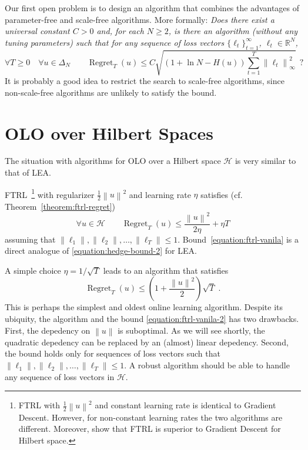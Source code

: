 \documentclass{colt2016} %
\DeclareMathOperator{\Regret}{Regret}
\newcommand{\R}{\mathbb{R}}     %
\renewcommand{\H}{\mathcal{H}}  %
\newcommand{\norm}[1]{\left\|{#1}\right\|}
\begin{document}
Our first open problem is to design an algorithm that combines the advantages
of parameter-free and scale-free algorithms. More formally: \emph{Does there
exist a universal constant $C > 0$ and, for each $N \ge 2$, is there an
algorithm (without any tuning parameters) such that for any sequence of loss
vectors $\{\ell_t\}_{t=1}^\infty$, $\ell_t \in \R^N$,}
$$
\forall T \ge 0 \quad \forall u \in \Delta_N \qquad \Regret_T(u) \le C \sqrt{(1 + \ln N - H(u)) \sum_{t=1}^T \norm{\ell_t}_\infty^2} \ \ ?
$$
It is probably a good idea to restrict the search to scale-free algorithms,
since non-scale-free algorithms are unlikely to satisfy the bound.

\section{OLO over Hilbert Spaces}

The situation with algorithms for OLO over a Hilbert space $\H$ is very similar
to that of LEA.

FTRL~\footnote{FTRL with $\frac{1}{2}\norm{u}^2$ and constant learning rate is
identical to Gradient Descent. However, for non-constant learning rates the two
algorithms are different.  Moreover, \cite{Orabona-Pal-2016-scale-free} show
that FTRL is superior to Gradient Descent for Hilbert space.} with regularizer
$\frac{1}{2}\norm{u}^2$ and learning rate $\eta$ satisfies (cf. Theorem~\ref{theorem:ftrl-regret})
\begin{equation}
\label{equation:ftrl-vanila}
\forall u \in \H \qquad \Regret_T(u) \le \frac{\norm{u}^2}{2\eta} + \eta T
\end{equation}
assuming that $\norm{\ell_1}, \norm{\ell_2}, \dots, \norm{\ell_T} \le 1$.
Bound~\eqref{equation:ftrl-vanila} is a direct analogue of
\eqref{equation:hedge-bound-2} for LEA.

A simple choice $\eta = 1/\sqrt{T}$ leads to an algorithm that satisfies
\begin{equation}
\label{equation:ftrl-vanila-2}
\Regret_T(u) \le \left(1+\frac{\norm{u}^2}{2}\right)\sqrt{T} \; .
\end{equation}
This is perhaps the simplest and oldest online learning algorithm. Despite its
ubiquity, the algorithm and the bound \eqref{equation:ftrl-vanila-2} has two
drawbacks. First, the depedency on $\norm{u}$ is suboptimal. As we will see
shortly, the quadratic depedency can be replaced by an (almost) linear
depedency.  Second, the bound holds only for sequences of loss vectors such
that $\norm{\ell_1}, \norm{\ell_2}, \dots, \norm{\ell_T} \le 1$. A robust
algorithm should be able to handle any sequence of loss vectors in $\H$.
\end{document}
